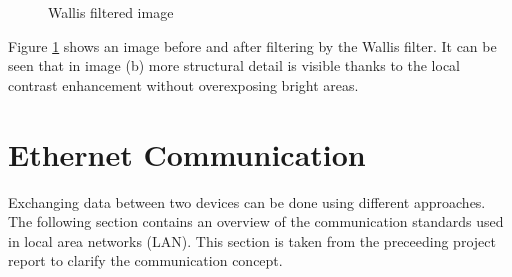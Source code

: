 \begin{figure}[t!]%
    \centering
    \qquad
    \caption{Wallis filtered image}%
    \label{fig:mission:wallisoutputimages}%
\end{figure}

Figure \ref{fig:mission:wallisoutputimages} shows an image before and after
filtering by the Wallis filter. It can be seen that in image (b) more
structural detail is visible thanks to the local contrast enhancement without
overexposing bright areas.

%
%
\section{Ethernet Communication} \label{chapt:theory:ethernet}
Exchanging data between two devices can be done using different approaches. The
following section contains an overview of the communication standards used in
local area networks (LAN). This section is taken from the preceeding project
report \cite{p5report} to clarify the communication concept.


